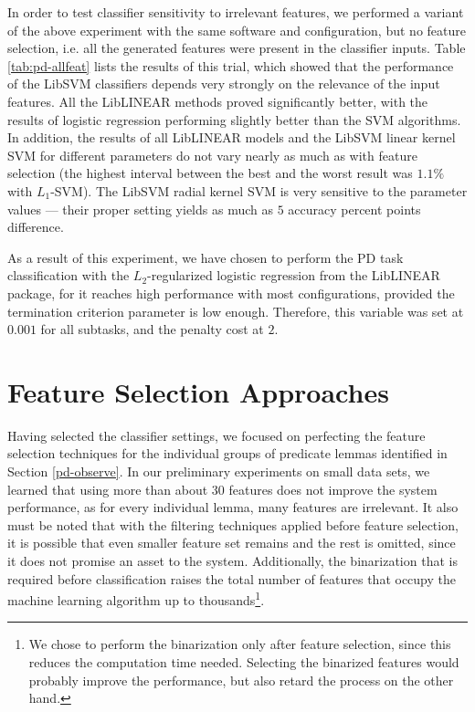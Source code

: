\documentclass[12pt,notitlepage]{report}
\begin{document}
In order to test classifier sensitivity to irrelevant features, we performed a variant of the above experiment with the same software and configuration, but no feature selection, i.e. all the generated features were present in the classifier inputs. Table \ref{tab:pd-allfeat} lists the results of this trial, which showed that the performance of the LibSVM classifiers depends very strongly on the relevance of the input features. All the LibLINEAR methods proved significantly better, with the results of logistic regression performing slightly better than the SVM algorithms. In addition, the results of all LibLINEAR models and the LibSVM linear kernel SVM for different parameters do not vary nearly as much as with feature selection (the highest interval between the best and the worst result was $1.1\%$ with $L_1$-SVM). The LibSVM radial kernel SVM is very sensitive to the parameter values --- their proper setting yields as much as $5$ accuracy percent points difference. 

As a result of this experiment, we have chosen to perform the PD task classification with the $L_2$-regularized logistic regression from the LibLINEAR package, for it reaches high performance with most configurations, provided the termination criterion parameter is low enough. Therefore, this variable was set at $0.001$ for all subtasks, and the penalty cost at $2$.

\section{Feature Selection Approaches}\label{pd-training}

Having selected the classifier settings, we focused on perfecting the feature selection techniques for the individual groups of predicate lemmas identified in Section \ref{pd-observe}. In our preliminary experiments on small data sets, we learned that using more than about 30 features does not improve the system performance, as for every individual lemma, many features are irrelevant. It also must be noted that with the filtering techniques applied before feature selection, it is possible that even smaller feature set remains and the rest is omitted, since it does not promise an asset to the system. Additionally, the binarization that is required before classification raises the total number of features that occupy the machine learning algorithm up to thousands\footnote{We chose to perform the binarization only after feature selection, since this reduces the computation time needed. Selecting the binarized features would probably improve the performance, but also retard the process on the other hand.}.
\end{document}
